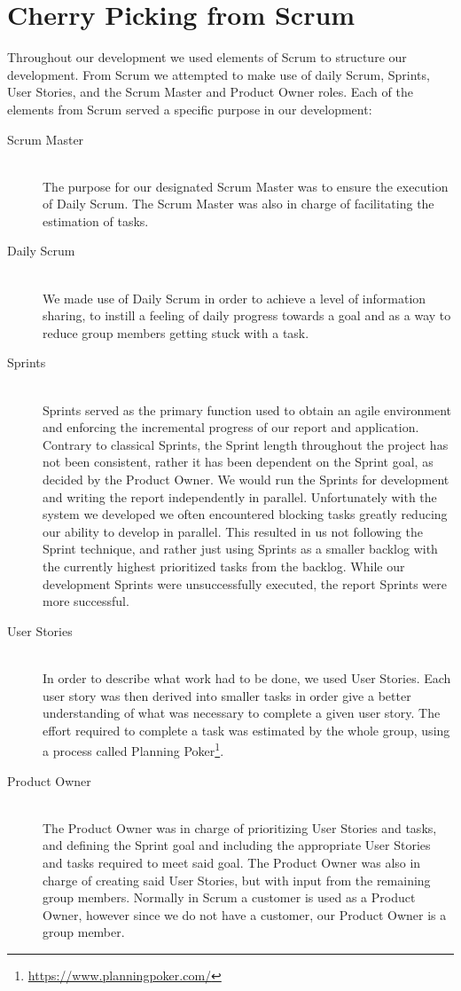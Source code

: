 \section{Cherry Picking from Scrum}
Throughout our development we used elements of Scrum to structure our development.
From Scrum we attempted to make use of daily Scrum, Sprints, User Stories, and the Scrum Master and Product Owner roles.
Each of the elements from Scrum served a specific purpose in our development:
\begin{description}
    \item [Scrum Master] \hfill \\
        The purpose for our designated Scrum Master was to ensure the execution of Daily Scrum.
        The Scrum Master was also in charge of facilitating the estimation of tasks.
    \item [Daily Scrum] \hfill \\
        We made use of Daily Scrum in order to achieve a level of information sharing, to instill a feeling of daily progress towards a goal and as a way to reduce group members getting stuck with a task.
    \item [Sprints] \hfill \\
        Sprints served as the primary function used to obtain an agile environment and enforcing the incremental progress of our report and application.
        Contrary to classical Sprints, the Sprint length throughout the project has not been consistent, rather it has been dependent on the Sprint goal, as decided by the Product Owner.
        We would run the Sprints for development and writing the report independently in parallel.
        Unfortunately with the system we developed we often encountered blocking tasks greatly reducing our ability to develop in parallel.
        This resulted in us not following the Sprint technique, and rather just using Sprints as a smaller backlog with the currently highest prioritized tasks from the backlog.
        While our development Sprints were unsuccessfully executed, the report Sprints were more successful.
    \item [User Stories] \hfill \\
        In order to describe what work had to be done, we used User Stories.
        Each user story was then derived into smaller tasks in order give a better understanding of what was necessary to complete a given user story.
        The effort required to complete a task was estimated by the whole group, using a process called Planning Poker\footnote{\url{https://www.planningpoker.com/}}.
    \item [Product Owner] \hfill \\
        The Product Owner was in charge of prioritizing User Stories and tasks, and defining the Sprint goal and including the appropriate User Stories and tasks required to meet said goal.
        The Product Owner was also in charge of creating said User Stories, but with input from the remaining group members.
        Normally in Scrum a customer is used as a Product Owner, however since we do not have a customer, our Product Owner is a group member.
\end{description}


